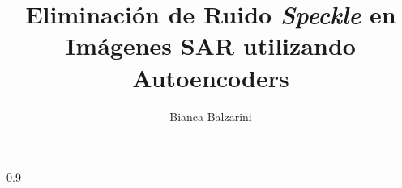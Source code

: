 \documentclass[a4paper,12pt,spanish,customfont,numbered,print,index]{PhDThesisPSnPDF}
\title{Eliminación de Ruido \emph{Speckle} en Imágenes SAR utilizando Autoencoders}
\author{Bianca Balzarini}
\begin{document}
\setlength{\parskip}{0.4em} %
	
	\frontmatter
	
	\maketitle
	
%	
%	
%	
%	
	
	
	\tableofcontents
	
	\listoffigures
	
	\listoftables
	
	
	\printnomenclature
	
	\mainmatter
	
	
	
    
	
	
	
	
	
	\backmatter
	
	\begin{spacing}{0.9}
		

            \nocite{*}
		
		\cleardoublepage
		
		
		
		
		
	\end{spacing}
	
\end{document}
